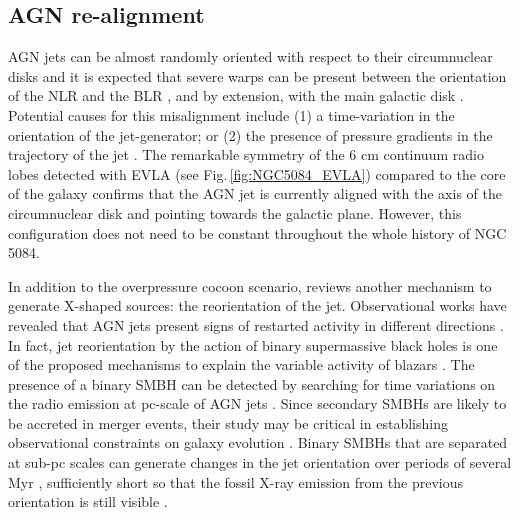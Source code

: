 \documentclass[modern]{aastex631}
\begin{document}
\subsection{AGN re-alignment}
\label{subsec:discussion_realignment}

AGN jets can be almost randomly oriented with respect to their circumnuclear disks \citep{schmitt+2002apj575_150}  and it is expected that severe warps can be present between the orientation of the NLR and the BLR \citep{lawrence+2010apj714_561}, and by extension, with the main galactic disk \citep{clarke+1998apj495_189, nagar+1999apj516_97, kinney+2000apj537_152}. Potential causes for this misalignment include (1) a time-variation in the orientation of the jet-generator; or (2) the presence of pressure gradients in the trajectory of the jet \citep{gallimore+2006aj132_546}. The remarkable symmetry of the 6 cm continuum radio lobes detected with EVLA (see Fig.\,\ref{fig:NGC5084_EVLA}) compared to the core of the galaxy confirms that the AGN jet is currently aligned with the axis of the circumnuclear disk and pointing towards the galactic plane. However, this configuration does not need to be constant throughout the whole history of NGC\,5084. 

In addition to the overpressure cocoon scenario, \citet{giri+2024sci11_1371101} reviews another mechanism to generate X-shaped sources: the reorientation of the jet. Observational works have revealed that AGN jets present signs of restarted activity in different directions  \citep{saripalli+2013mnras436_690, nandi+2021apj908_178}. In fact, jet reorientation by the action of binary supermassive black holes is one of the proposed mechanisms to explain the variable activity of blazars \citep{britzen+2018mnras478_3199}. The presence of a binary SMBH can be detected by searching for time variations on the radio emission at pc-scale of AGN jets \citep{jiang+2023apj959_11}. Since secondary SMBHs are likely to be accreted in merger events, their study may be critical in establishing observational constraints on galaxy evolution \citep{yu2002mnras331_935}. Binary SMBHs that are separated at sub-pc scales can generate changes in the jet orientation over periods of several Myr \citep{giri+2024sci11_1371101}, sufficiently short so that the fossil X-ray emission from the previous orientation is still visible \citep[$\sim10-20$ Myr]{zubovas+2022mnras515_1705}. 
\end{document}
